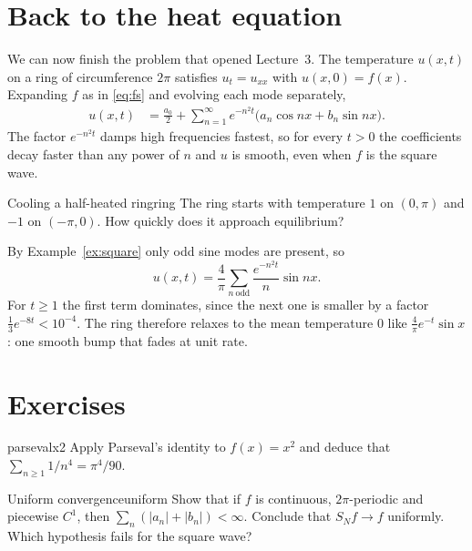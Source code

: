 \documentclass[11pt]{article}
\begin{document}
\section{Back to the heat equation}

We can now finish the problem that opened Lecture~3. The temperature
$u(x,t)$ on a ring of circumference $2\pi$ satisfies $u_t = u_{xx}$ with
$u(x,0)=f(x)$. Expanding $f$ as in \eqref{eq:fs} and evolving each mode
separately,
\begin{align*}
  u(x,t) &= \frac{a_0}{2} + \sum_{n=1}^{\infty} e^{-n^2 t}
            \bigl(a_n\cos nx + b_n\sin nx\bigr).
\end{align*}
The factor $e^{-n^2t}$ damps high frequencies fastest, so for every $t>0$ the
coefficients decay faster than any power of $n$ and $u$ is smooth, even when
$f$ is the square wave.

\begin{example}{Cooling a half-heated ring}{ring}
The ring starts with temperature $1$ on $(0,\pi)$ and $-1$ on $(-\pi,0)$.
How quickly does it approach equilibrium?
\begin{solution}
By Example~\ref{ex:square} only odd sine modes are present, so
\[
  u(x,t) = \frac{4}{\pi}\sum_{n\ \mathrm{odd}}\frac{e^{-n^2t}}{n}\sin nx .
\]
For $t\ge 1$ the first term dominates, since the next one is smaller by a
factor $\tfrac13 e^{-8t}<10^{-4}$. The ring therefore relaxes to the mean
temperature $0$ like $\frac{4}{\pi}e^{-t}\sin x$: one smooth bump that
fades at unit rate.
\end{solution}
\end{example}

\section{Exercises}

\begin{exercise}{}{parsevalx2}
Apply Parseval's identity to $f(x)=x^2$ and deduce that
$\sum_{n\ge1}1/n^4 = \pi^4/90$.
\end{exercise}

\begin{exercise}{Uniform convergence}{uniform}
Show that if $f$ is continuous, $2\pi$-periodic and piecewise $C^1$, then
$\sum_n(|a_n|+|b_n|)<\infty$. Conclude that $S_Nf\to f$ uniformly. Which
hypothesis fails for the square wave?
\end{exercise}
\end{document}
